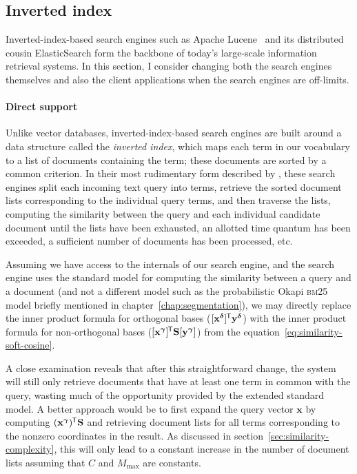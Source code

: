\documentclass[
  digital, %
  notable, %
  lof,     %
  lot,     %
  nopalatino, color
]{fithesis3}
\def\abbr#1{\textsc{\MakeLowercase{#1}}}
\let\term\emph
\newcommand*{\tran}{^{\mkern-1.5mu\mathsf{T}}}
\let\emph=\textit
\begin{document}

\subsection{Inverted index}
\label{sec:similarity-inverted-index}
Inverted-index-based search engines such as Apache Lucene~\cite{bialecki12} and its distributed cousin
ElasticSearch form the backbone of today's large-scale
information retrieval systems. In this section, I consider changing both
the search engines themselves and also the client applications when the
search engines are off-limits.

\paragraph{Direct support}
Unlike vector databases, inverted-index-based search engines are built around a
data structure called the \term{inverted index},
which maps each term in our vocabulary to a list of documents containing the
term; these documents are sorted by a common criterion. In their most
rudimentary form described by \textcite{ml:IntroIR2008}, these search engines
split each incoming text query into terms, retrieve the sorted document lists
corresponding to the individual query terms, and then traverse the lists,
computing the similarity between the query and each individual candidate
document until the lists have been exhausted, an allotted time quantum has been
exceeded, a sufficient number of documents has been processed, etc.

Assuming we have access to the internals of our search engine, and the search
engine uses the standard model for computing the similarity between a query and
a document (and not a different model such as the probabilistic Okapi \abbr{BM}25
\index{Okapi \abbr{BM}25} model briefly mentioned in
chapter~\ref{chap:segmentation}), we may directly replace the inner product
formula for orthogonal bases ($[\mathbf x^{\bm\delta}]\tran\mathbf y^{\bm\delta}$)
with the inner product formula for non-orthogonal bases ($[\mathbf
x^{\bm\gamma}]\tran\mathbf S[\mathbf y^{\bm\gamma}]$) from the
equation~\ref{eq:similarity-soft-cosine}.

A close examination reveals that after this straightforward change, the system
will still only retrieve documents that have at least one term in common with
the query, wasting much of the opportunity provided by the extended standard
model. A better approach would be to first expand the query vector $\mathbf x$
by computing $(\mathbf x^{\bm\gamma})\tran\mathbf S$ and retrieving document
lists for all terms corresponding to the nonzero coordinates in the result. As
discussed in section~\ref{sec:similarity-complexity}, this will only lead to a
constant increase in the number of document lists assuming that $C$
and $M_{\max}$ are constants.
\end{document}
